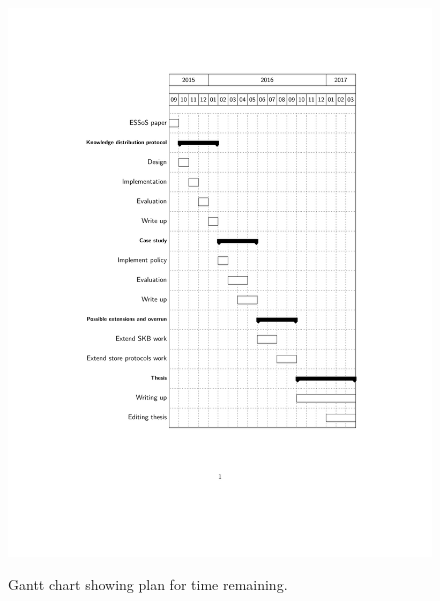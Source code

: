 \documentclass[a4paper]{scrartcl}
\begin{document}
\begin{figure}
\caption{Gantt chart showing plan for time remaining.}
\includegraphics[width=\linewidth]{gantt.pdf}
\label{fig:gantt}
\end{figure}
\end{document}
